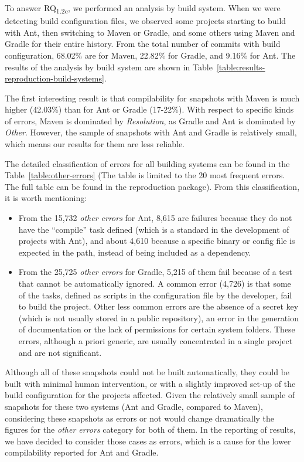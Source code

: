 To answer RQ\textsubscript{1.2c}, we performed an analysis by build system. When we were detecting build configuration files, we observed some projects starting to build with Ant, then switching to Maven or Gradle, and some others using Maven and Gradle for their entire history. From the total number of commits with build configuration, 68.02\% are for Maven, 22.82\% for Gradle, and 9.16\% for Ant. The results of the analysis by build system are shown in Table~\ref{table:results-reproduction-build-systems}.

The first interesting result is that compilability for snapshots with Maven is much higher (42.03\%) than for Ant or Gradle (17-22\%). With respect to specific kinds of errors, Maven is dominated by \textit{Resolution}, as Gradle and Ant is dominated by \textit{Other}. However, the sample of snapshots with Ant and Gradle is relatively small, which means our results for them are less reliable.

The detailed classification of errors for all building systems can be found in the Table~\ref{table:other-errors} (The table is limited to the 20 most frequent errors. The full table can be found in the reproduction package). 
From this classification, it is worth mentioning:
\begin{itemize}
 \item From the 15,732 \textit{other errors} for Ant, 8,615 are failures because they do not have the ``compile'' task defined (which is a standard in the development of projects with Ant), and about 4,610 because a specific binary or config file is expected in the path, instead of being included as a dependency.
 \item From the 25,725 \textit{other errors} for Gradle, 5,215 of them fail because of a test that cannot be automatically ignored. A common error (4,726) is that some of the tasks, defined as scripts in the configuration file by the developer, fail to build the project. Other less common errors are the absence of a secret key (which is not usually stored in a public repository), an error in the generation of documentation or the lack of permissions for certain system folders. These errors, although a priori generic, are usually concentrated in a single project and are not significant.
\end{itemize} 

Although all of these snapshots could not be built automatically, they could be built with minimal human intervention, or with a slightly improved set-up of the build configuration for the projects affected. Given the relatively small sample of snapshots for these two systems (Ant and Gradle, compared to Maven), considering these snapshots as errors or not would change dramatically the figures for the \textit{other errors} category for both of them. In the reporting of results, we have decided to consider those cases as errors, which is a cause for the lower compilability reported for Ant and Gradle.

